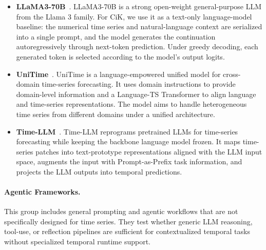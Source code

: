 \begin{itemize}
    \item \textbf{LLaMA3-70B}~\citep{DBLP:journals/corr/abs-2407-21783}.
    LLaMA3-70B is a strong open-weight general-purpose LLM from the Llama 3 family. For CiK, we use it as a text-only language-model baseline: the numerical time series and natural-language context are serialized into a single prompt, and the model generates the continuation autoregressively through next-token prediction. Under greedy decoding, each generated token is selected according to the model's output logits.

    \item \textbf{UniTime}~\citep{DBLP:conf/www/LiuHLDLHZ24}.
    UniTime is a language-empowered unified model for cross-domain time-series forecasting. It uses domain instructions to provide domain-level information and a Language-TS Transformer to align language and time-series representations. The model aims to handle heterogeneous time series from different domains under
    a unified architecture.

    \item \textbf{Time-LLM}~\citep{DBLP:conf/iclr/0005WMCZSCLLPW24}.
    Time-LLM reprograms pretrained LLMs for time-series forecasting while keeping the backbone language model frozen. It maps time-series patches into text-prototype representations aligned with the LLM input space, augments the input with Prompt-as-Prefix task information, and projects the LLM outputs into temporal predictions.
\end{itemize}

\paragraph{Agentic Frameworks.}
This group includes general prompting and agentic workflows that are not specifically designed for time series. They test whether generic LLM reasoning, tool-use, or reflection pipelines are sufficient for contextualized temporal tasks without specialized temporal runtime support.

